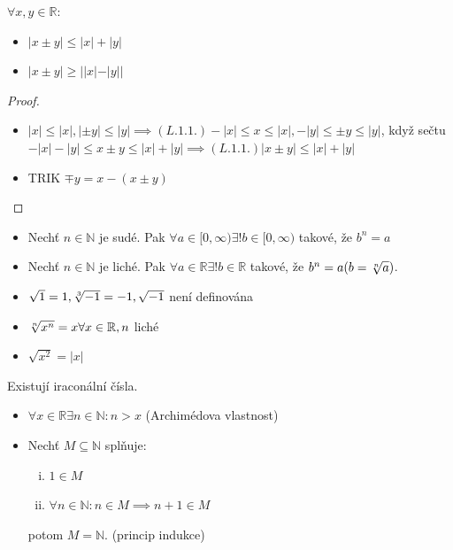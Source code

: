 \begin{veta}
  $\forall x, y \in \mathbb R:$
  \begin{itemize}
    \item $|x \pm y| \leq |x| + |y|$
    \item $|x \pm y| \geq ||x|-|y||$
  \end{itemize}
\end{veta}

\begin{proof}
  \begin{itemize}
    \item $|x| \leq |x|, |\pm y| \leq |y| \implies (L.1.1.) -|x| \leq x \leq |x|, -|y| \leq \pm y \leq |y|$, když sečtu $-|x|-|y| \leq x \pm y \leq |x|+|y| \implies (L.1.1.) |x\pm y| \leq |x| + |y|$
    \item TRIK $\mp y = x - ( x \pm y)$
  \end{itemize}
\end{proof}

\begin{axiom}
  \begin{itemize}
    \item Nechť  $n \in \mathbb N$ je sudé. Pak $\forall a \in [0, \infty) \exists! b \in [0, \infty)$ takové, že $b^n = a$
    \item Nechť $n \in \mathbb N$ je liché. Pak $\forall a \in \mathbb R \exists ! b \in \mathbb R$ takové, že $b^n = a (b = \root n \of {a})$.
  \end{itemize}
\end{axiom}

\begin{poznamka}
  \begin{itemize}
    \item $\sqrt{1} = 1, \root 3 \of {-1} = -1, \sqrt{-1}$ není definována
    \item $\root n \of {x^n} = x \forall x \in \mathbb R, n$ liché
    \item $\sqrt{x^2} = |x|$
  \end{itemize}
\end{poznamka}

\begin{veta}
  Existují iraconální čísla.
\end{veta}

\begin{axiom}
  \begin{itemize}
    \item $\forall x \in \mathbb R \exists n \in \mathbb N: n > x$ (Archimédova vlastnost)
    \item Nechť $M \subseteq \mathbb N$ splňuje:
    \begin{enumerate}[i.]
      \item $1 \in M$
      \item $\forall n \in \mathbb N: n \in M \implies n+1 \in M$
    \end{enumerate} potom $M = \mathbb N$. (princip indukce)
  \end{itemize}
\end{axiom}

